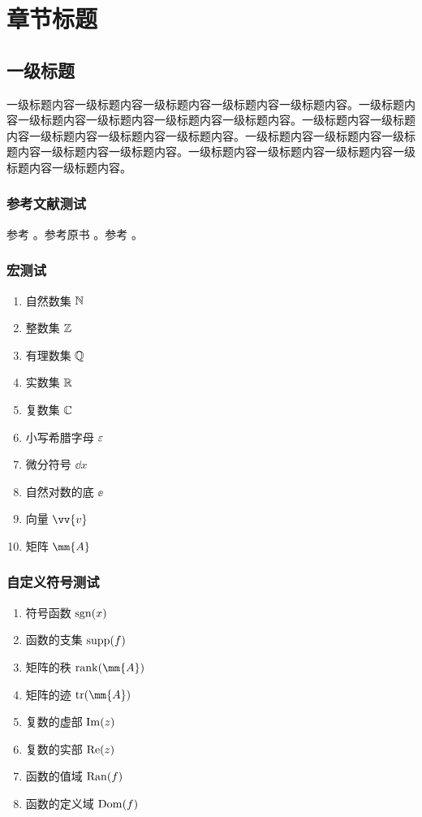 \chapter{章节标题}

\section{一级标题}

一级标题内容一级标题内容一级标题内容一级标题内容一级标题内容。一级标题内容一级标题内容一级标题内容一级标题内容一级标题内容。一级标题内容一级标题内容一级标题内容一级标题内容一级标题内容。一级标题内容一级标题内容一级标题内容一级标题内容一级标题内容。一级标题内容一级标题内容一级标题内容一级标题内容一级标题内容。

\subsection{参考文献测试}

参考 \cite{classical_mechanics}。参考原书 \cite[p.42]{topology}。参考 \textcite[第二章]{topology}。

\subsection{宏测试} 

\begin{enumerate}
    \item 自然数集 $\mathbb{N}$
    \item 整数集 $\mathbb{Z}$
    \item 有理数集 $\mathbb{Q}$
    \item 实数集 $\mathbb{R}$
    \item 复数集 $\mathbb{C}$
    \item 小写希腊字母 $\varepsilon$
    \item 微分符号 $\dd x$
    \item 自然对数的底 $\ee$
    \item 向量 $\vv{v}$
    \item 矩阵 $\mm{A}$
\end{enumerate}
\newpage

\subsection{自定义符号测试}

\begin{enumerate}
    \item 符号函数 $\operatorname{sgn}(x)$
    \item 函数的支集 $\operatorname{supp}(f)$
    \item 矩阵的秩 $\rank(\mm{A})$
    \item 矩阵的迹 $\tr(\mm{A})$
    \item 复数的虚部 $\operatorname{Im}(z)$
    \item 复数的实部 $\operatorname{Re}(z)$
    \item 函数的值域 $\operatorname{Ran}(f)$
    \item 函数的定义域 $\operatorname{Dom}(f)$
\end{enumerate}